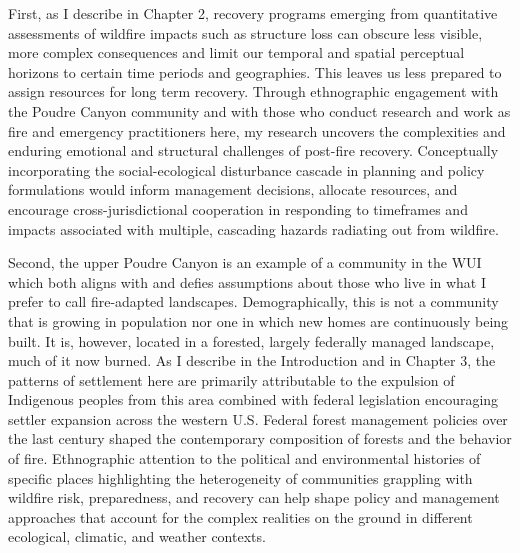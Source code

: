 \documentclass[
]{article}
\begin{document}
First, as I describe in Chapter 2, recovery programs emerging from quantitative assessments of wildfire impacts such as structure loss can obscure less visible, more complex consequences and limit our temporal and spatial perceptual horizons to certain time periods and geographies. This leaves us less prepared to assign resources for long term recovery. Through ethnographic engagement with the Poudre Canyon community and with those who conduct research and work as fire and emergency practitioners here, my research uncovers the complexities and enduring emotional and structural challenges of post-fire recovery. Conceptually incorporating the social-ecological disturbance cascade in planning and policy formulations would inform management decisions, allocate resources, and encourage cross-jurisdictional cooperation in responding to timeframes and impacts associated with multiple, cascading hazards radiating out from wildfire.

Second, the upper Poudre Canyon is an example of a community in the WUI which both aligns with and defies assumptions about those who live in what I prefer to call fire-adapted landscapes. Demographically, this is not a community that is growing in population nor one in which new homes are continuously being built. It is, however, located in a forested, largely federally managed landscape, much of it now burned. As I describe in the Introduction and in Chapter 3, the patterns of settlement here are primarily attributable to the expulsion of Indigenous peoples from this area combined with federal legislation encouraging settler expansion across the western U.S. Federal forest management policies over the last century shaped the contemporary composition of forests and the behavior of fire. Ethnographic attention to the political and environmental histories of specific places highlighting the heterogeneity of communities grappling with wildfire risk, preparedness, and recovery can help shape policy and management approaches that account for the complex realities on the ground in different ecological, climatic, and weather contexts.
\end{document}
